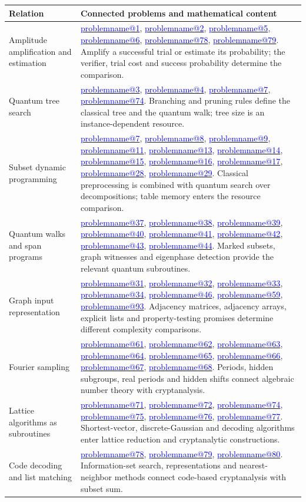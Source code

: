 \documentclass[11pt,a4paper]{article}
\makeatletter
\theoremstyle{problemstyle}
\newcommand{\problemref}[1]{\hyperref[entry:#1]{\textcolor{blue}{\csname problemname@#1\endcsname}}}
\makeatother
\begin{document}
\begingroup\small
\begin{longtable}{@{}>{\raggedright\arraybackslash}p{}>{\raggedright\arraybackslash}p{}@{}}
\toprule
Relation & Connected problems and mathematical content \\
\midrule
\endhead
Amplitude amplification and estimation & \problemref{1}, \problemref{2}, \problemref{5}, \problemref{6}, \problemref{78}, \problemref{79}. Amplify a successful trial or estimate its probability; the verifier, trial cost and success probability determine the comparison. \\[5pt]
Quantum tree search & \problemref{3}, \problemref{4}, \problemref{7}, \problemref{74}. Branching and pruning rules define the classical tree and the quantum walk; tree size is an instance-dependent resource. \\[5pt]
Subset dynamic programming & \problemref{7}, \problemref{8}, \problemref{9}, \problemref{11}, \problemref{13}, \problemref{14}, \problemref{15}, \problemref{16}, \problemref{17}, \problemref{28}, \problemref{29}. Classical preprocessing is combined with quantum search over decompositions; table memory enters the resource comparison. \\[5pt]
Quantum walks and span programs & \problemref{37}, \problemref{38}, \problemref{39}, \problemref{40}, \problemref{41}, \problemref{42}, \problemref{43}, \problemref{44}. Marked subsets, graph witnesses and eigenphase detection provide the relevant quantum subroutines. \\[5pt]
Graph input representation & \problemref{31}, \problemref{32}, \problemref{33}, \problemref{34}, \problemref{46}, \problemref{59}, \problemref{93}. Adjacency matrices, adjacency arrays, explicit lists and property-testing promises determine different complexity comparisons. \\[5pt]
Fourier sampling & \problemref{61}, \problemref{62}, \problemref{63}, \problemref{64}, \problemref{65}, \problemref{66}, \problemref{67}, \problemref{68}. Periods, hidden subgroups, real periods and hidden shifts connect algebraic number theory with cryptanalysis. \\[5pt]
Lattice algorithms as subroutines & \problemref{71}, \problemref{72}, \problemref{74}, \problemref{75}, \problemref{76}, \problemref{77}. Shortest-vector, discrete-Gaussian and decoding algorithms enter lattice reduction and cryptanalytic constructions. \\[5pt]
Code decoding and list matching & \problemref{78}, \problemref{79}, \problemref{80}. Information-set search, representations and nearest-neighbor methods connect code-based cryptanalysis with subset sum. \\[5pt]

\end{longtable}
\end{document}
